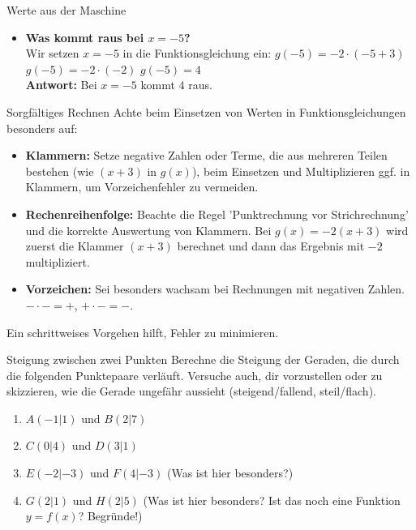 \begin{loesungsumgebung}{Werte aus der Maschine}
\begin{enumerate}
\begin{itemize}
        \item \textbf{Was kommt raus bei $x=-5$?} \\
        Wir setzen $x=-5$ in die Funktionsgleichung ein:
        $g(-5) = -2 \cdot (-5+3)$
        $g(-5) = -2 \cdot (-2)$
        $g(-5) = 4$ \\
        \textbf{Antwort:} Bei $x=-5$ kommt $4$ raus.
    \end{itemize}
\end{enumerate}

\begin{tippumgebung}{Sorgfältiges Rechnen}
Achte beim Einsetzen von Werten in Funktionsgleichungen besonders auf:
\begin{itemize}
    \item \textbf{Klammern:} Setze negative Zahlen oder Terme, die aus mehreren Teilen bestehen (wie $(x+3)$ in $g(x)$), beim Einsetzen und Multiplizieren ggf. in Klammern, um Vorzeichenfehler zu vermeiden.
    \item \textbf{Rechenreihenfolge:} Beachte die Regel 'Punktrechnung vor Strichrechnung' und die korrekte Auswertung von Klammern. Bei $g(x) = -2(x+3)$ wird zuerst die Klammer $(x+3)$ berechnet und dann das Ergebnis mit $-2$ multipliziert.
    \item \textbf{Vorzeichen:} Sei besonders wachsam bei Rechnungen mit negativen Zahlen. $- \cdot - = +$, $+ \cdot - = -$.
\end{itemize}
Ein schrittweises Vorgehen hilft, Fehler zu minimieren.
\end{tippumgebung}

\end{loesungsumgebung}

\begin{aufgabenumgebung}{Steigung zwischen zwei Punkten}
Berechne die Steigung der Geraden, die durch die folgenden Punktepaare verläuft. Versuche auch, dir vorzustellen oder zu skizzieren, wie die Gerade ungefähr aussieht (steigend/fallend, steil/flach).
\begin{enumerate}
    \item $A(-1|1)$ und $B(2|7)$
    \item $C(0|4)$ und $D(3|1)$
    \item $E(-2|-3)$ und $F(4|-3)$ (Was ist hier besonders?)
    \item $G(2|1)$ und $H(2|5)$ (Was ist hier besonders? Ist das noch eine Funktion $y=f(x)$? Begründe!)
\end{enumerate}
\end{aufgabenumgebung}



